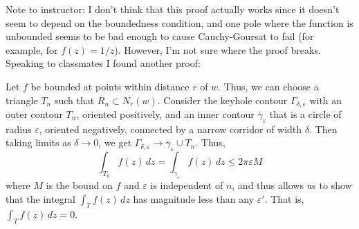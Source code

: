 \documentclass[12 pt, letterpaper]{hmcpset}
\begin{document}
\begin{solution}
	Note to instructor: I don't think that this proof actually works since it doesn't seem to depend on the boundedness condition, and one pole where the function is unbounded seems to be bad enough to cause Cauchy-Goursat to fail (for example, for $f(z) = 1/z$). However, I'm not sure where the proof breaks. Speaking to classmates I found another proof:

	Let $f$ be bounded at points within distance $r$ of $w$. Thus, we can choose a triangle $T_{n}$ such that $R_{n} \subset N_{r}(w)$. Consider the keyhole contour $\Gamma_{\delta, \varepsilon}$ with an outer contour $T_{n}$, oriented positively, and an inner contour $\overline{\gamma}_{\varepsilon}$ that is a circle of radius $\varepsilon$, oriented negatively, connected by a narrow corridor of width $\delta$. Then taking limits as $\delta \to 0$, we get $\Gamma_{\delta, \varepsilon} \to \overline{\gamma}_{\varepsilon} \cup T_{n}$. Thus,
	\[
		\int_{T_{n}} f(z) \, dz = \int_{\gamma_{\varepsilon}} f(z) \, dz \le 2 \pi \varepsilon M 
	\]
	where $M$ is the bound on $f$ and $\varepsilon$ is independent of $n$, and thus allows us to show that the integral $\int_{T} f(z) \, dz $ has magnitude less than any $\varepsilon'$. That is, $\int_{T} f(z) \, dz = 0$.
\end{solution}
\end{document}
